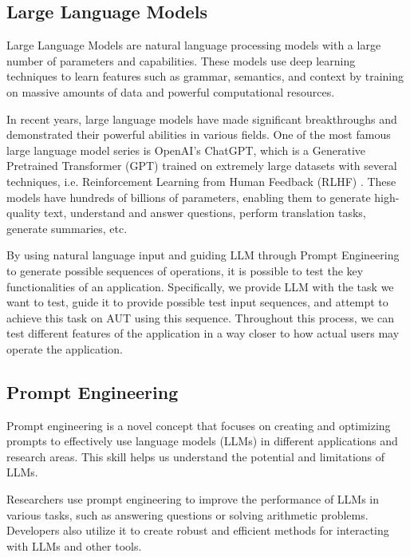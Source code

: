\documentclass[conference]{IEEEtran}
\begin{document}
\subsection{Large Language Models}

Large Language Models are natural language processing models with a large number of parameters and capabilities. These models use deep learning techniques\cite{DeepLearning} to learn features such as grammar, semantics, and context by training on massive amounts of data and powerful computational resources.

In recent years, large language models have made significant breakthroughs and demonstrated their powerful abilities in various fields. One of the most famous large language model series is OpenAI's ChatGPT, which is a Generative Pretrained Transformer (GPT) \cite{vaswani2017attention} \cite{brown2020language} trained on extremely large datasets with several techniques, i.e. Reinforcement Learning from Human Feedback (RLHF) \cite{ouyang2022training}. These models have hundreds of billions of parameters, enabling them to generate high-quality text, understand and answer questions, perform translation tasks, generate summaries, etc.

By using natural language input and guiding LLM through Prompt Engineering to generate possible sequences of operations, it is possible to test the key functionalities of an application. Specifically, we provide LLM with the task we want to test, guide it to provide possible test input sequences, and attempt to achieve this task on AUT using this sequence. Throughout this process, we can test different features of the application in a way closer to how actual users may operate the application.

\subsection{Prompt Engineering}

Prompt engineering\cite{wei2022chain} is a novel concept that focuses on creating and optimizing prompts to effectively use language models (LLMs)\cite{brown2020language} in different applications and research areas. This skill helps us understand the potential and limitations of LLMs.

Researchers use prompt engineering to improve the performance of LLMs in various tasks, such as answering questions or solving arithmetic problems. Developers also utilize it to create robust and efficient methods for interacting with LLMs and other tools.
\end{document}
